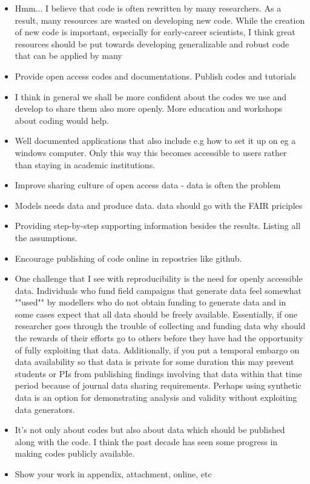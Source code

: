 \documentclass{article}
\begin{document}
\begin{itemize}
	\item Hmm... I believe that code is often rewritten by many researchers. As a result, many resources are wasted on developing new code. While the creation of new code is important, especially for early-career scientists, I think great resources should be put towards developing generalizable and robust code that can be applied by many
	\item Provide open access codes and documentations. Publish codes and tutorials
	\item I think in general we shall be more confident about the codes we use and develop to share them also more openly. More education and workshops about coding would help.
	\item Well documented applications that also include e.g how to set it up on eg a windows computer. Only this way this becomes accessible to users rather than staying in academic institutions. 
	\item Improve sharing culture of open access data - data is often the problem
	\item Models needs data and produce data. data should go with the FAIR priciples
	\item Providing step-by-step supporting information besides the results. Listing all the assumptions.
	\item Encourage publishing of code online in repostries like github.
	\item One challenge that I see with reproducibility is the need for openly accessible data. Individuals who fund field campaigns that generate data feel somewhat ""used"" by modellers who do not obtain funding to generate data and in some cases expect that all data should be freely available. Essentially, if one researcher goes through the trouble of collecting and funding data why should the rewards of their efforts go to others before they have had the opportunity of fully exploiting that data. Additionally, if you put a temporal embargo on data availability so that data is private for some duration this may prevent students or PIs from publishing findings involving that data within that time period because of journal data sharing requirements. Perhaps using synthetic data is an option for demonstrating analysis and validity without exploiting data generators.
	\item It's not only about codes but also about data which should be published along with the code. I think the past decade has seen some progress in making codes publicly available.
	\item Show your work in appendix, attachment, online, etc

\end{itemize}
\end{document}
